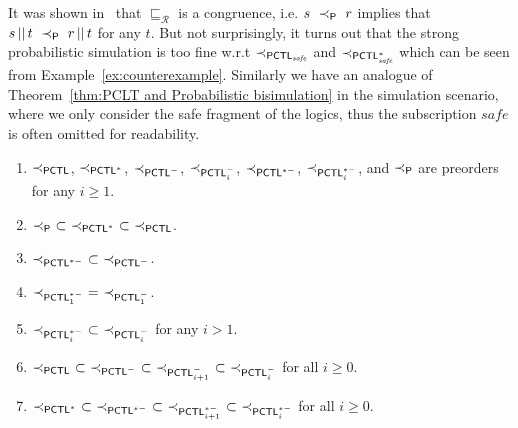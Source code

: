 \documentclass{LMCS}
\DeclareMathOperator{\interleave}{||}
\newcommand{\Si}{\prec}
\newcommand{\SP}{\ensuremath{\prec_{{\sf P}}}}
\newcommand{\PCTL}{{\sf PCTL}}
\newcommand{\PCTLS}{{\sf PCTL}^{*}}
\newcommand{\SEPCTL}{\prec_{\PCTL}}
\newcommand{\SEPCTLM}{\prec_{\PCTL^{-}}}
\newcommand{\iSEPCTLM}[1]{\prec_{\PCTL^{-}_{#1}}}
\newcommand{\SEPCTLS}{\prec_{\PCTL^{*}}}
\newcommand{\SEPCTLSM}{\prec_{\PCTL^{*-}}}
\newcommand{\iSEPCTLSM}[1]{\prec_{\PCTL_{#1}^{*-}}}
\newcommand{\PAR}[2]{#1\interleave#2}
\newcommand{\MC}[1]{\mathcal{#1}}
\newcommand{\MI}[1]{\mathit{#1}}
\newcommand{\DSI}[1][\MC{R}]{\sqsubseteq_{#1}}
\begin{document}
It was shown in~\cite{SegalaL95} that $\DSI$ is a congruence,
i.e. $s~\SP~r$ implies that $\PAR{s}{t}~\SP~\PAR{r}{t}$ for any $t$.
But not surprisingly, it turns out that the strong probabilistic simulation is too fine
w.r.t $\Si_{\PCTL_{\MI{safe}}}$ and $\Si_{\PCTLS_{\MI{safe}}}$ which can be seen from Example~\ref{ex:counterexample}.
Similarly we have an analogue of Theorem~\ref{thm:PCLT and Probabilistic bisimulation} in the simulation scenario,
where we only consider the safe fragment of the logics,
thus the subscription $\MI{safe}$ is often omitted for readability.
\begin{thm}\label{thm:PCLT and Probabilistic simulation}\hfill
\begin{enumerate}[\em(1)]
\item $\SEPCTL$, $\SEPCTLS$, $\SEPCTLM$, $\iSEPCTLM{i}$, $\SEPCTLSM$, $\iSEPCTLSM{i}$, and $\SP$ are preorders for any $i\geq 1$.
\item $\SP~\subset~\SEPCTLS~\subset~\SEPCTL$.
\item $\SEPCTLSM~\subset~\SEPCTLM$.
\item $\iSEPCTLSM{1}~=~\iSEPCTLM{1}$.
\item $\iSEPCTLSM{i}~\subset~\iSEPCTLM{i}$ for any $i>1$.
\item $\SEPCTL~\subset~\SEPCTLM~\subset~\iSEPCTLM{i+1}~\subset~\iSEPCTLM{i}$ for all $i\geq 0$.
\item $\SEPCTLS~\subset~\SEPCTLSM~\subset~\iSEPCTLSM{i+1}~\subset~\iSEPCTLSM{i}$ for all $i\geq 0$.
\end{enumerate}
\end{thm}
\end{document}

